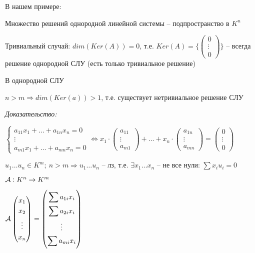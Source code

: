\documentclass[12pt]{article}
\begin{document}
\begin{propos}{}
    В нашем примере:

    Множество решений однородной линейной системы -- подпространство в $K^n$

    Тривиальный случай: $dim(Ker(A)) = 0$, т.е. $Ker(A) = \{\left( \begin{gathered}
        0 \\
        \vdots \\
        0
    \end{gathered} \right) \}$ -- всегда решение однородной СЛУ (есть только тривиальное решение)
\end{propos}

\begin{theo}{}
    В однородной СЛУ

    $n > m \Rightarrow dim(Ker(a)) > 1$, т.е.  существует нетривиальное решение СЛУ
\end{theo}

\textit{Доказательство:}

$\begin{cases}
    a_{11}x_1 + \ldots + a_{1n}x_n = 0 \\
    \vdots \\
    a_{m1}x_1 + \ldots + a_{mn}x_n = 0
\end{cases} \Leftrightarrow x_1 \cdot \left( \begin{gathered}
    a_{11} \\
    \vdots \\
    a_{m1}
\end{gathered} \right) + \ldots + x_n \cdot \left( \begin{gathered}
    a_{1n} \\
    \vdots \\
    a_{mn}
\end{gathered} \right) = \left( \begin{gathered}
    0 \\
    \vdots \\
    0
\end{gathered} \right)$

$u_1 \ldots u_n \in K^m;\ n > m \Rightarrow u_1 \ldots u_n$ -- лз, т.е. $\exists x_1 \ldots x_n$ -- не все нули: $\sum x_iu_i = 0$

$\mathcal{A} : K^n \rightarrow K^m$

$\mathcal{A} \left( \begin{gathered}
    x_1 \\
    x_2 \\
    \vdots \\
    x_n
\end{gathered} \right) = \left( \begin{gathered}
    \sum a_{1i}x_i \\
    \sum a_{2i}x_i \\
    \vdots \\
    \sum a_{mi}x_i
\end{gathered} \right)$
\end{document}

